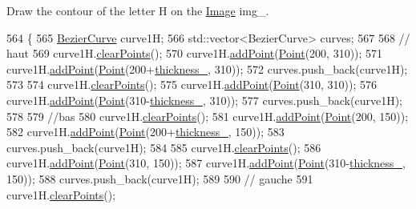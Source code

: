 Draw the contour of the letter H on the \mbox{\hyperlink{class_image}{Image}} img\+\_\+. 


\begin{DoxyCode}
564               \{
565     \mbox{\hyperlink{class_bezier_curve}{BezierCurve}} curve1H;
566     std::vector<BezierCurve> curves;
567 
568     \textcolor{comment}{// haut}
569     curve1H.\mbox{\hyperlink{class_bezier_curve_a0ba8ce66d5af5971ae6a1b506029728e}{clearPoints}}();
570     curve1H.\mbox{\hyperlink{class_bezier_curve_a38d16c18b36ae45619b05e26e226cf34}{addPoint}}(\mbox{\hyperlink{class_point}{Point}}(200, 310));
571     curve1H.\mbox{\hyperlink{class_bezier_curve_a38d16c18b36ae45619b05e26e226cf34}{addPoint}}(\mbox{\hyperlink{class_point}{Point}}(200+\mbox{\hyperlink{class_font_v1_aed8040e76be9a52833627b92f0fb4e5f}{thickness\_}}, 310));
572     curves.push\_back(curve1H);
573 
574     curve1H.\mbox{\hyperlink{class_bezier_curve_a0ba8ce66d5af5971ae6a1b506029728e}{clearPoints}}();
575     curve1H.\mbox{\hyperlink{class_bezier_curve_a38d16c18b36ae45619b05e26e226cf34}{addPoint}}(\mbox{\hyperlink{class_point}{Point}}(310, 310));
576     curve1H.\mbox{\hyperlink{class_bezier_curve_a38d16c18b36ae45619b05e26e226cf34}{addPoint}}(\mbox{\hyperlink{class_point}{Point}}(310-\mbox{\hyperlink{class_font_v1_aed8040e76be9a52833627b92f0fb4e5f}{thickness\_}}, 310));
577     curves.push\_back(curve1H);
578 
579     \textcolor{comment}{//bas}
580     curve1H.\mbox{\hyperlink{class_bezier_curve_a0ba8ce66d5af5971ae6a1b506029728e}{clearPoints}}();
581     curve1H.\mbox{\hyperlink{class_bezier_curve_a38d16c18b36ae45619b05e26e226cf34}{addPoint}}(\mbox{\hyperlink{class_point}{Point}}(200, 150));
582     curve1H.\mbox{\hyperlink{class_bezier_curve_a38d16c18b36ae45619b05e26e226cf34}{addPoint}}(\mbox{\hyperlink{class_point}{Point}}(200+\mbox{\hyperlink{class_font_v1_aed8040e76be9a52833627b92f0fb4e5f}{thickness\_}}, 150));
583     curves.push\_back(curve1H);
584 
585     curve1H.\mbox{\hyperlink{class_bezier_curve_a0ba8ce66d5af5971ae6a1b506029728e}{clearPoints}}();
586     curve1H.\mbox{\hyperlink{class_bezier_curve_a38d16c18b36ae45619b05e26e226cf34}{addPoint}}(\mbox{\hyperlink{class_point}{Point}}(310, 150));
587     curve1H.\mbox{\hyperlink{class_bezier_curve_a38d16c18b36ae45619b05e26e226cf34}{addPoint}}(\mbox{\hyperlink{class_point}{Point}}(310-\mbox{\hyperlink{class_font_v1_aed8040e76be9a52833627b92f0fb4e5f}{thickness\_}}, 150));
588     curves.push\_back(curve1H);
589 
590     \textcolor{comment}{// gauche}
591     curve1H.\mbox{\hyperlink{class_bezier_curve_a0ba8ce66d5af5971ae6a1b506029728e}{clearPoints}}();

\end{DoxyCode}
